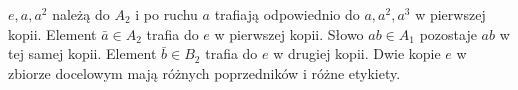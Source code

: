 \begin{przyklad}
$e,a,a^2$ należą do $A_2$ i po ruchu $a$ trafiają odpowiednio do $a,a^2,a^3$ w pierwszej kopii. Element $\bar a\in A_2$ trafia do $e$ w pierwszej kopii. Słowo $ab\in A_1$ pozostaje $ab$ w tej samej kopii. Element $\bar b\in B_2$ trafia do $e$ w drugiej kopii. Dwie kopie $e$ w zbiorze docelowym mają różnych poprzedników i różne etykiety.
\end{przyklad}

